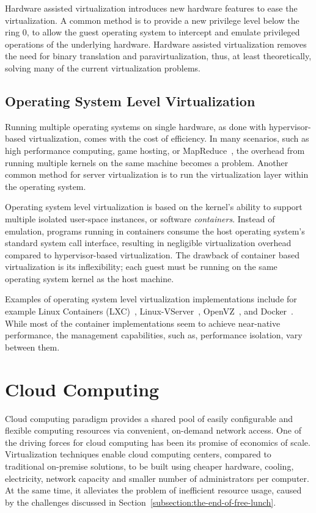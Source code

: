 Hardware assisted virtualization introduces new hardware features to ease the virtualization. A common method is to provide a new privilege level below the ring 0, to allow the guest operating system to intercept and emulate privileged operations of the underlying hardware. Hardware assisted virtualization removes the need for binary translation and paravirtualization, thus, at least theoretically, solving many of the current virtualization problems.~\cite{Horne:2007:Understanding, Pearce:2013:VIS}

\subsection{Operating System Level Virtualization}
Running multiple operating systems on single hardware, as done with hypervisor-based virtualization, comes with the cost of efficiency. In many scenarios, such as high performance computing, game hosting, or MapReduce~\cite{Dean:2008:MR}, the overhead from running multiple kernels on the same machine becomes a problem. Another common method for server virtualization is to run the virtualization layer within the operating system.~\cite{Soltesz:2007:COS, Xavier:2014:Containers}

Operating system level virtualization is based on the kernel's ability to support multiple isolated user-space instances, or software \emph{containers}. Instead of emulation, programs running in containers consume the host operating system's standard system call interface, resulting in negligible virtualization overhead compared to hypervisor-based virtualization. The drawback of container based virtualization is its inflexibility; each guest must be running on the same operating system kernel as the host machine.~\cite{Soltesz:2007:COS, Xavier:2014:Containers}

Examples of operating system level virtualization implementations include for example Linux Containers (LXC)~\cite{LinuxContainers:2013:LXC}, Linux-VServer~\cite{Des:2005:Virtualization}, OpenVZ~\cite{OpenVZ:2013}, and Docker~\cite{Merkel:2014:Docker}. While most of the container implementations seem to achieve near-native performance, the management capabilities, such as, performance isolation, vary between them.

\section{Cloud Computing}
Cloud computing paradigm provides a shared pool of easily configurable and flexible computing resources via convenient, on-demand network access. One of the driving forces for cloud computing has been its promise of economics of scale. Virtualization techniques enable cloud computing centers, compared to traditional on-premise solutions, to be built using cheaper hardware, cooling, electricity, network capacity and smaller number of administrators per computer. At the same time, it alleviates the problem of inefficient resource usage, caused by the challenges discussed in Section~\ref{subsection:the-end-of-free-lunch}.~\cite{Mell:2011:ccdef}

